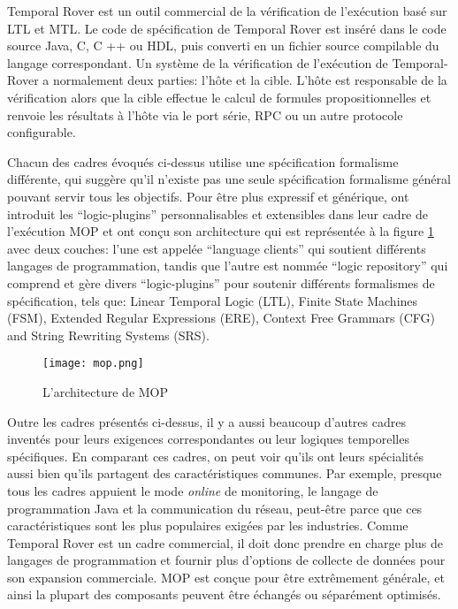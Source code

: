 Temporal Rover \citep{drusinsky2000temporal} est un outil commercial de la vérification de l'exécution basé sur LTL et MTL. Le code de spécification de Temporal Rover est inséré dans le code source Java, C, C ++ ou HDL, puis converti en un fichier source compilable du langage correspondant. Un système de la vérification de l'exécution de Temporal-Rover a normalement deux parties: l'hôte et la cible. L'hôte est responsable de la vérification alors que la cible effectue le calcul de formules propositionnelles et renvoie les résultats à l'hôte via le port série, RPC ou un autre protocole configurable.

Chacun des cadres évoqués ci-dessus utilise une spécification formalisme différente, qui suggère qu'il n'existe pas une seule spécification formalisme général pouvant servir tous les objectifs. Pour être plus expressif et générique, \cite{chen2007mop} ont introduit les ``logic-plugins'' personnalisables et extensibles dans leur cadre de l'exécution MOP et ont conçu son architecture qui est représentée à la figure \ref{img:mop} avec deux couches: l'une est appelée ``language clients'' qui soutient différents langages de programmation, tandis que l'autre est nommée ``logic repository'' qui comprend et gère divers ``logic-plugins'' pour soutenir différents formalismes de spécification, tels que: Linear Temporal Logic (LTL), Finite State Machines (FSM), Extended Regular Expressions (ERE), Context Free Grammars (CFG) and String Rewriting Systems (SRS).

\begin{figure}[h]
\begin{center}
\centering
\texttt{[image: mop.png]}
\caption{L'architecture de MOP \citep{chen2007mop}}
\label{img:mop}
\end{center}
\end{figure}

Outre les cadres présentés ci-dessus, il y a aussi beaucoup d'autres cadres inventés pour leurs exigences correspondantes ou leur logiques temporelles spécifiques. En comparant ces cadres, on peut voir qu'ils ont leurs spécialités aussi bien qu'ils partagent des caractéristiques communes. Par exemple, presque tous les cadres appuient le mode \emph{online} de monitoring, le langage de programmation Java et la communication du réseau, peut-être parce que ces caractéristiques sont les plus populaires exigées par les industries. Comme Temporal Rover est un cadre commercial, il doit donc prendre en charge plus de langages de programmation et fournir plus d'options de collecte de données pour son expansion commerciale. MOP est conçue pour être extrêmement générale, et ainsi la plupart des composants peuvent être échangés ou séparément optimisés.
